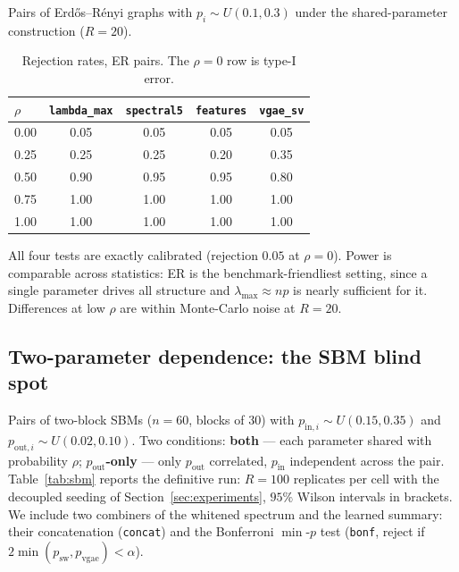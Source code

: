 \documentclass[11pt]{article}
\begin{document}
Pairs of Erd\H{o}s--R\'enyi graphs with $p_i \sim U(0.1, 0.3)$ under the
shared-parameter construction ($R = 20$).

\begin{table}[ht]
\centering
\caption{Rejection rates, ER pairs. The $\rho = 0$ row is type-I error.}
\label{tab:er}
\begin{tabular}{lcccc}
\toprule
$\rho$ & \texttt{lambda\_max} & \texttt{spectral5} & \texttt{features} & \texttt{vgae\_sv} \\
\midrule
0.00 & 0.05 & 0.05 & 0.05 & 0.05 \\
0.25 & 0.25 & 0.25 & 0.20 & 0.35 \\
0.50 & 0.90 & 0.95 & 0.95 & 0.80 \\
0.75 & 1.00 & 1.00 & 1.00 & 1.00 \\
1.00 & 1.00 & 1.00 & 1.00 & 1.00 \\
\bottomrule
\end{tabular}
\end{table}

All four tests are exactly calibrated (rejection $0.05$ at $\rho = 0$). Power
is comparable across statistics: ER is the benchmark-friendliest setting, since
a single parameter drives all structure and $\lambda_{\max} \approx np$ is
nearly sufficient for it. Differences at low $\rho$ are within Monte-Carlo
noise at $R = 20$.

\subsection{Two-parameter dependence: the SBM blind spot}\label{sec:sbm}

Pairs of two-block SBMs ($n = 60$, blocks of $30$) with
$p_{\mathrm{in}, i} \sim U(0.15, 0.35)$ and
$p_{\mathrm{out}, i} \sim U(0.02, 0.10)$. Two conditions:
\textbf{both} --- each parameter shared with probability $\rho$;
\textbf{$p_{\mathrm{out}}$-only} --- only $p_{\mathrm{out}}$ correlated,
$p_{\mathrm{in}}$ independent across the pair. Table~\ref{tab:sbm} reports the
definitive run: $R = 100$ replicates per cell with the decoupled seeding of
Section~\ref{sec:experiments}, $95\%$ Wilson intervals in brackets. We include
two combiners of the whitened spectrum and the learned summary: their
concatenation (\texttt{concat}) and the Bonferroni $\min$-$p$ test
(\texttt{bonf}, reject if $2\min(p_{\mathrm{sw}}, p_{\mathrm{vgae}}) < \alpha$).
\end{document}

